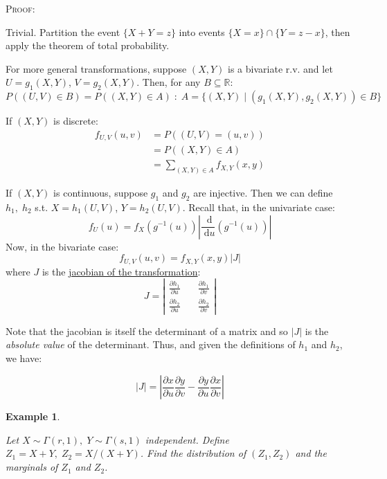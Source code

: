 \documentclass[12pt,a4paper]{article}
\newtheorem{ex}[thm]{Example}
\newcommand{\diff}{\;\mathrm{d}}
\begin{document}
\noindent\textsc{Proof:}\par\vspace{1cm}
\indent Trivial. Partition the event $\{X+Y=z\}$ into events $\{X=x\}\cap\{Y=z-x\}$, then apply the theorem of total probability.\par\vspace{1cm}

For more general transformations, suppose $(X,Y)$ is a bivariate r.v. and let $U=g_1(X,Y)$, $V=g_2(X,Y)$. Then, for any $B \subseteq \mathbb{R}$:
$$P((U,V)\in B) = P((X,Y) \in A)\; : \; A =\{(X,Y)\; | \; (g_1(X,Y),g_2(X,Y)) \in B\}$$

\noindent If $(X,Y)$ is discrete:
\begin{align*}
f_{U,V}(u,v) &= P((U,V)=(u,v))\\
&= P((X,Y)\in A)\\
&= \!\!\!\!\!\!\!\sum\limits_{(X,Y)\in A} \!\!\!\!\!\!\!\!f_{X,Y}(x,y)
\end{align*}

If $(X,Y)$ is continuous, suppose $g_1$ and $g_2$ are injective. Then we can define $h_1,\; h_2$ s.t. $X=h_1(U,V)$, $Y=h_2(U,V)$. Recall that, in the univariate case:
$$f_U(u) = f_X\left(g^{-1}(u)\right) \left| \frac{\diff}{\diff u}\left(g^{-1}(u)\right)\right|$$
Now, in the bivariate case:
$$f_{U,V}(u,v) = f_{X,Y}(x,y)|J|$$
where $J$ is the \underline{jacobian of the transformation}:
\begingroup
\renewcommand*{\arraystretch}{1.5}
$$J = \left|\begin{array}{cc} \frac{\partial h_1}{\partial u}\quad & \frac{\partial h_1}{\partial v}\\ \frac{\partial h_2}{\partial u}\quad & \frac{\partial h_2}{\partial v}\end{array}\right|$$
\endgroup

Note that the jacobian is itself the determinant of a matrix and so $|J|$ is the \emph{absolute value} of the determinant. Thus, and given the definitions of $h_1$ and $h_2$, we have:

$$|J| = \left| \frac{\partial x}{\partial u}\frac{\partial y}{\partial v} - \frac{\partial y}{\partial u}\frac{\partial x}{\partial v}\right|$$

\begin{ex}$\;$\par
\vspace{1cm}

Let $X \sim \Gamma(r,1),\; Y \sim \Gamma(s,1)$ independent. Define $Z_1=X+Y,\; Z_2=X/(X+Y)$. Find the distribution of $(Z_1,Z_2)$ and the marginals of $Z_1$ and $Z_2$.
\end{ex}
\end{document}
